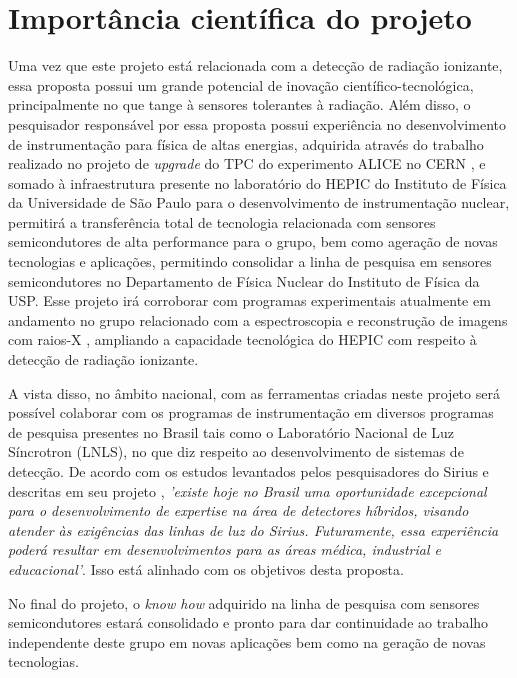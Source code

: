 \chapter{Importância científica do projeto}

\thispagestyle{plain}
Uma vez que este projeto está relacionada com a detecção de radiação ionizante, essa proposta possui um grande potencial de inovação científico-tecnológica, principalmente no que tange à sensores tolerantes à radiação. Além disso, o pesquisador responsável por essa proposta possui experiência no desenvolvimento de instrumentação para física de altas energias, adquirida através do trabalho realizado no projeto de {\it upgrade} do TPC do experimento ALICE no CERN \cite{tpcNIM,discharge_paper,GSI_REPO,THGEM}, e somado à infraestrutura presente no laboratório do HEPIC do Instituto de Física da Universidade de São Paulo para o desenvolvimento de instrumentação nuclear, permitirá a transferência total de tecnologia relacionada com sensores semicondutores de alta performance para o grupo, bem como ageração de novas tecnologias e aplicações, permitindo consolidar a linha de pesquisa em sensores semicondutores no Departamento de Física Nuclear do Instituto de Física da USP. Esse projeto irá corroborar com programas experimentais atualmente em andamento no grupo relacionado com a espectroscopia e reconstrução de imagens com raios-X \cite{THGEM,NIM,xray}, ampliando a capacidade tecnológica do HEPIC com respeito à detecção de radiação ionizante. 
\thispagestyle{plain}

A vista disso, no âmbito nacional, com as ferramentas criadas neste projeto será possível colaborar com os programas de instrumentação em diversos programas de pesquisa presentes no Brasil tais como o Laboratório Nacional de Luz Síncrotron (LNLS), no que diz respeito ao desenvolvimento de sistemas de detecção. De acordo com os estudos levantados pelos pesquisadores do Sirius e descritas em seu projeto \cite{sirius}, {\it 'existe hoje no Brasil uma oportunidade excepcional para o desenvolvimento de expertise na área de detectores híbridos, visando atender às exigências das linhas de luz do Sirius. Futuramente, essa experiência poderá resultar em desenvolvimentos para as áreas médica, industrial e educacional'}. Isso está alinhado com os objetivos desta proposta.

\thispagestyle{plain}
No final do projeto, o {\it know how} adquirido na linha de pesquisa com sensores semicondutores estará consolidado e pronto para dar continuidade ao trabalho independente deste grupo em novas aplicações bem como na geração de novas tecnologias.

\renewcommand{\cleardoublepage}{}
\renewcommand{\clearpage}{}